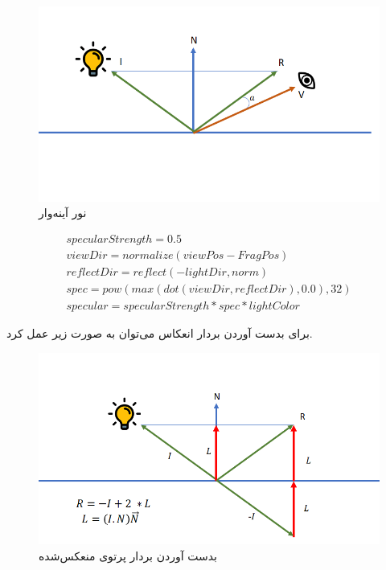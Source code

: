 \begin{figure}[ht]
	\centerline{\includegraphics[width=\textwidth,height=\textheight,keepaspectratio]{Figures/Ch5/SpecularLight_1.png}}

	\caption{نور آینه‌وار}
	\label{fig:SpecularLight_1}
  \end{figure}
  

\begin{gather*}
	specularStrength = 0.5 \\
	viewDir = normalize(viewPos - FragPos) \\
	reflectDir = reflect(-lightDir, norm) \\
	spec = pow(max(dot(viewDir, reflectDir), 0.0), 32) \\
	specular = specularStrength * spec * lightColor
\end{gather*}


برای بدست آوردن بردار انعکاس می‌‌توان به صورت زیر عمل کرد.

\begin{figure}[ht]
	\centerline{\includegraphics[width=\textwidth,height=\textheight,keepaspectratio]{Figures/Ch5/SpecularLight_2.png}}

	\caption{بدست آوردن بردار پرتوی منعکس‌شده}
	\label{fig:SpecularLight_2}
\end{figure}




